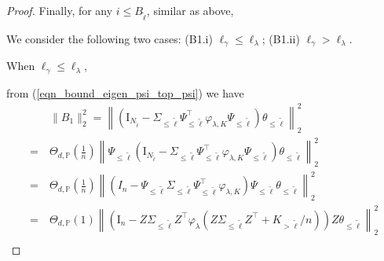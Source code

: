 \documentclass{article}
\theoremstyle{plain}
\theoremstyle{definition}
\theoremstyle{remark}
\newcommand{\reg}{\varphi_\lambda}
\begin{document}
\begin{appendix}
\begin{proof}
Finally, for any $i \leq B_{\tilde{\ell}}$, similar as above, 
\fi







We consider the following two cases: (B1.i) $\ell_{\gamma} \leq \ell_\lambda$; 
(B1.ii) $\ell_{\gamma} > \ell_\lambda$.




When $\ell_{\gamma} \leq \ell_\lambda$, 

from (\ref{eqn_bound_eigen_psi_top_psi}) we have
\iffalse
\begin{equation}\label{eqn_b1_spe_origin}
    \begin{aligned}
                &~\|B_1\|_{2}^{2} = 
                \left\| \left( \mathrm{I}_{N_{\tilde{\ell}}} - \Sigma_{\leq \tilde{\ell}} \Psi^{\top}_{\leq \tilde{\ell}} \varphi_{\lambda, K} \Psi_{\leq \tilde{\ell}}\right)    \theta_{\leq \tilde{\ell}} \right\|_{2}^{2}\\
                =&~ 
                \Theta_{d, \mathbb{P}}\left(\frac{1}{n}\right)
                \left\| \Psi_{\leq \tilde{\ell}}\left( \mathrm{I}_{N_{\tilde{\ell}}} - \Sigma_{\leq \tilde{\ell}} \Psi^{\top}_{\leq \tilde{\ell}} \varphi_{\lambda, K} \Psi_{\leq \tilde{\ell}}\right)    \theta_{\leq \tilde{\ell}} \right\|_{2}^{2}\\
                =&~ 
                \Theta_{d, \mathbb{P}}\left(\frac{1}{n}\right)
                \left\| \left( I_{n} - \Psi_{\leq \tilde{\ell}}\Sigma_{\leq \tilde{\ell}} \Psi^{\top}_{\leq \tilde{\ell}} \varphi_{\lambda, K} \right) 
                \Psi_{\leq \tilde{\ell}}\theta_{\leq \tilde{\ell}} \right\|_{2}^{2}\\
                {=}&~
        \Theta_{d, \mathbb{P}}\left(1\right)
        \left\| \left( \mathrm{I}_n - Z\Sigma_{\leq \tilde{\ell}} Z^{\top} \reg(Z\Sigma_{\leq \tilde{\ell}} Z^{\top} +K_{>\tilde{\ell}}/n) \right) 
                Z\theta_{\leq \tilde{\ell}} \right\|_{2}^{2}\\

\end{aligned}
\end{equation}
\end{proof}
\end{appendix}
\end{document}
